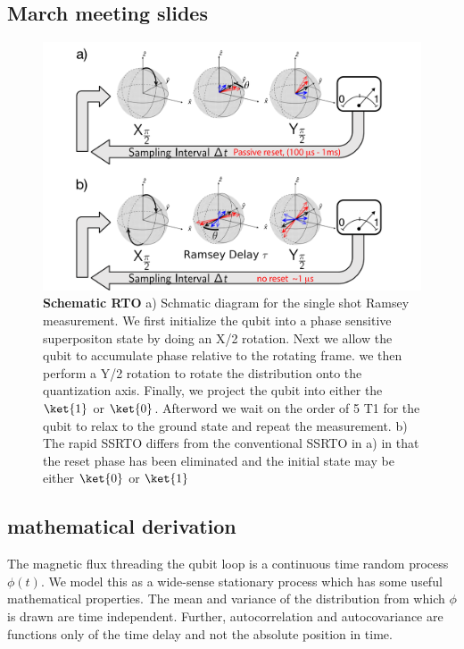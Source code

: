 \subsection{March meeting slides}
\begin{figure}[h]
    \begin{center}
    \includegraphics[width=175mm]{./PDF/ssrto_schematic_191001_646p.pdf}
    \end{center}
    \caption{\textbf{Schematic RTO}
    a) Schmatic diagram for the single shot Ramsey measurement.
    We first initialize the qubit into a phase sensitive superpositon state by doing an X/2 rotation.
    Next we allow the qubit to accumulate phase relative to the rotating frame.
    we then perform a Y/2 rotation to rotate the distribution onto the quantization axis.
    Finally, we project the qubit into either the $\ket{1}$ or $\ket{0}$.
    Afterword we wait on the order of 5 T1 for the qubit to relax to the ground state and repeat the measurement.
    b) The rapid SSRTO differs from the conventional SSRTO in a) in that the reset phase has been eliminated and the initial state may be either $\ket{0}$ or $\ket{1}$
    }
    \label{SSRTO Schematic}
\end{figure}

\subsection{mathematical derivation }

The magnetic flux threading the qubit loop is a continuous time random process $\phi (t)$.
We model this as a wide-sense stationary process which has some useful mathematical properties.
The mean and variance of the distribution from which $\phi$ is drawn are time independent.
Further, autocorrelation and autocovariance are functions only of the time delay and not the absolute position in time.

